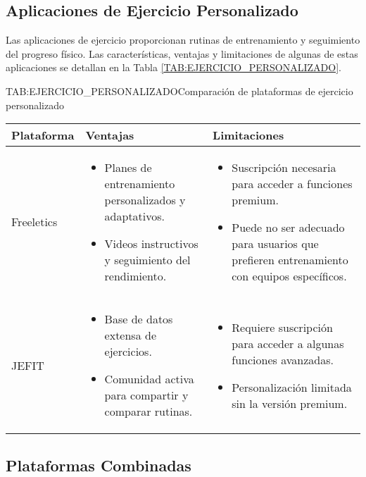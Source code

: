 \subsection{Aplicaciones de Ejercicio Personalizado}

Las aplicaciones de ejercicio proporcionan rutinas de entrenamiento y seguimiento del progreso físico. Las características, ventajas y limitaciones de algunas de estas aplicaciones se detallan en la Tabla \ref{TAB:EJERCICIO_PERSONALIZADO}.

\begin{table}[Plataformas de Ejercicio Personalizado]{TAB:EJERCICIO_PERSONALIZADO}{Comparación de plataformas de ejercicio personalizado}
  \begin{tabular}{|p{3cm}|p{5cm}|p{5cm}|}
    \hline
    \textbf{Plataforma} & \textbf{Ventajas} & \textbf{Limitaciones} \\
    \hline
    Freeletics & \begin{itemize}
      \item Planes de entrenamiento personalizados y adaptativos.
      \item Videos instructivos y seguimiento del rendimiento.
    \end{itemize} & \begin{itemize}
      \item Suscripción necesaria para acceder a funciones premium.
      \item Puede no ser adecuado para usuarios que prefieren entrenamiento con equipos específicos.
    \end{itemize} \\
    \hline
    JEFIT & \begin{itemize}
      \item Base de datos extensa de ejercicios.
      \item Comunidad activa para compartir y comparar rutinas.
    \end{itemize} & \begin{itemize}
      \item Requiere suscripción para acceder a algunas funciones avanzadas.
      \item Personalización limitada sin la versión premium.
    \end{itemize} \\
    \hline
  \end{tabular}
\end{table}

\subsection{Plataformas Combinadas}

